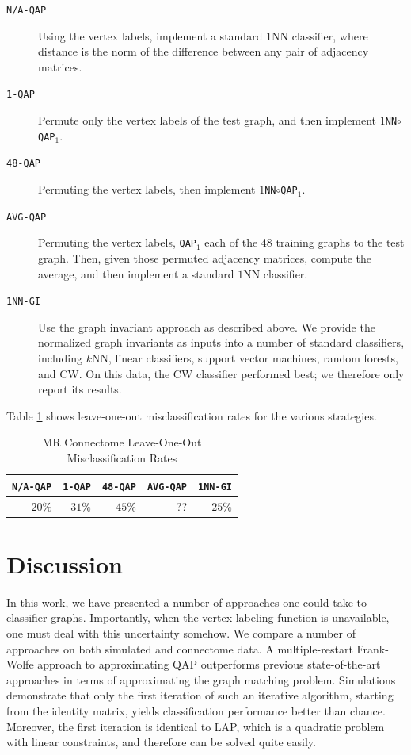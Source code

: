 \documentclass{article} %
\newcommand{\qapa}{\texttt{QAP$_1$} }
\begin{document}
\begin{description}
	\item[\texttt{N/A-QAP}] Using the vertex labels, implement a standard $1$NN classifier, where distance is the norm of the difference between any pair of adjacency matrices.
	\item[\texttt{1-QAP}] Permute only the vertex labels of the test graph, and then implement \texttt{$1$NN$\circ$QAP$_1$}.
	\item[\texttt{48-QAP}] Permuting the vertex labels, then implement \texttt{$1$NN$\circ$QAP$_1$}.
	\item[\texttt{AVG-QAP}] Permuting the vertex labels, \qapa each of the 48 training graphs to the test graph.  Then, given those permuted adjacency matrices, compute the average, and then implement a standard $1$NN classifier.
	\item[\texttt{1NN-GI}] Use the graph invariant approach as described above. We provide the normalized graph invariants as inputs into a number of standard classifiers, including $k$NN, linear classifiers, support vector machines, random forests, and CW. On this data, the CW classifier performed best; we therefore only report its results.
\end{description}

Table \ref{tab:connectome} shows leave-one-out misclassification rates for the various strategies.


\begin{table}[h!]
\caption{MR Connectome Leave-One-Out Misclassification Rates}
\begin{center}
\begin{tabular}{|r|r|r|r|r|}
\hline
\texttt{N/A-QAP} & \texttt{1-QAP} & \texttt{48-QAP} & \texttt{AVG-QAP} & \texttt{1NN-GI}\\
\hline
$20\%$ & $31\%$ & $45\%$ & ?? & $25\%$ \\
    \hline
\end{tabular}
\end{center}
\label{tab:connectome}
\end{table}%


\section{Discussion}


In this work, we have presented a number of approaches one could take to classifier graphs.  Importantly, when the vertex labeling function is unavailable, one must deal with this uncertainty somehow.  We compare a number of approaches on both simulated and connectome data.  A multiple-restart Frank-Wolfe approach to approximating QAP outperforms previous state-of-the-art approaches in terms of approximating the graph matching problem.  Simulations demonstrate that only the first iteration of such an iterative algorithm, starting from the identity matrix, yields classification performance better than chance.  Moreover, the first iteration is identical to LAP, which is a quadratic problem with linear constraints, and therefore can be solved quite easily.  
\end{document}

